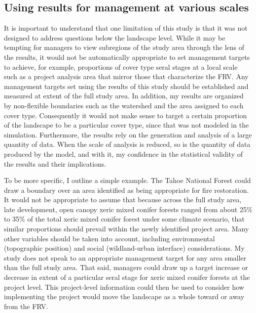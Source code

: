\subsection*{Using results for management at various scales}
It is important to understand that one limitation of this study is that it was not designed to address questions below the landscape level. While it may be tempting for managers to view subregions of the study area through the lens of the results, it would not be automatically appropriate to set management targets to achieve, for example, proportions of cover type seral stages at a local scale such as a project analysis area that mirror those that characterize the FRV. Any management targets set using the results of this study should be established and measured at extent of the full study area. In addition, my results are organized by non-flexible boundaries such as the watershed and the area assigned to each cover type. Consequently it would not make sense to target a certain proportion of the landscape to be a particular cover type, since that was not modeled in the simulation. Furthermore, the results rely on the generation and analysis of a large quantity of data. When the scale of analysis is reduced, so is the quantity of data produced by the model, and with it, my confidence in the statistical validity of the results and their implications. 

To be more specific, I outline a simple example. The Tahoe National Forest could draw a boundary over an area identified as being appropriate for fire restoration. It would not be appropriate to assume that because across the full study area, late development, open canopy xeric mixed conifer forests ranged from about 25\% to 35\% of the total xeric mixed conifer forest under some climate scenario, that similar proportions should prevail within the newly identified project area. Many other variables should be taken into account, including environmental (topographic position) and social (wildland-urban interface) considerations. My study does not speak to an appropriate management target for any area smaller than the full study area. That said, managers could draw up a target increase or decrease in extent of a particular seral stage for xeric mixed conifer forests at the project level. This project-level information could then be used to consider how implementing the project would move the landscape as a whole toward or away from the FRV. 

